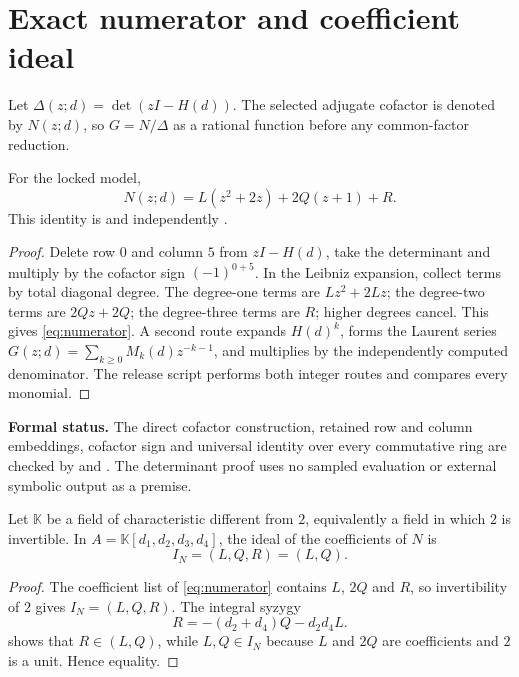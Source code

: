 \section{Exact numerator and coefficient ideal}\label{sec:numerator}

Let \(\Delta(z;d)=\det(zI-H(d))\).  The selected adjugate cofactor is denoted
by \(N(z;d)\), so \(G=N/\Delta\) as a rational function before any common-factor
reduction.

\begin{theorem}\label{thm:numerator}
For the locked model,
\begin{equation}\label{eq:numerator}
\boxed{N(z;d)=L(z^2+2z)+2Q(z+1)+R.}
\end{equation}
This identity is  and independently
.
\end{theorem}
\begin{proof}
Delete row \(0\) and column \(5\) from \(zI-H(d)\), take the determinant and
multiply by the cofactor sign \((-1)^{0+5}\).  In the Leibniz expansion, collect
terms by total diagonal degree.  The degree-one terms are
\(Lz^2+2Lz\); the degree-two terms are \(2Qz+2Q\); the degree-three terms are
\(R\); higher degrees cancel.  This gives \cref{eq:numerator}.  A second route
expands \(H(d)^k\), forms the Laurent series
\(G(z;d)=\sum_{k\ge0}M_k(d)z^{-k-1}\), and multiplies by the independently
computed denominator.  The release script performs both integer routes and
compares every monomial.
\end{proof}

\noindent\textbf{Formal status.}
The direct cofactor construction, retained row and column embeddings, cofactor
sign and universal identity over every commutative ring are checked by
 and
.  The determinant proof uses no sampled
evaluation or external symbolic output as a premise.

\begin{proposition}\label{prop:ideal}
Let \(\mathbb K\) be a field of characteristic different from \(2\),
equivalently a field in which \(2\) is invertible.  In
\(A=\mathbb K[d_1,d_2,d_3,d_4]\), the ideal of the coefficients of \(N\) is
\begin{equation}
I_N=(L,Q,R)=(L,Q).
\end{equation}
\end{proposition}
\begin{proof}
The coefficient list of \cref{eq:numerator} contains \(L\), \(2Q\) and \(R\),
so invertibility of \(2\) gives \(I_N=(L,Q,R)\).  The integral syzygy
\begin{equation}\label{eq:Rsyzygy}
R=-(d_2+d_4)Q-d_2d_4L.
\end{equation}
shows that \(R\in(L,Q)\), while \(L,Q\in I_N\) because \(L\) and \(2Q\) are
coefficients and \(2\) is a unit.  Hence equality.
\end{proof}


